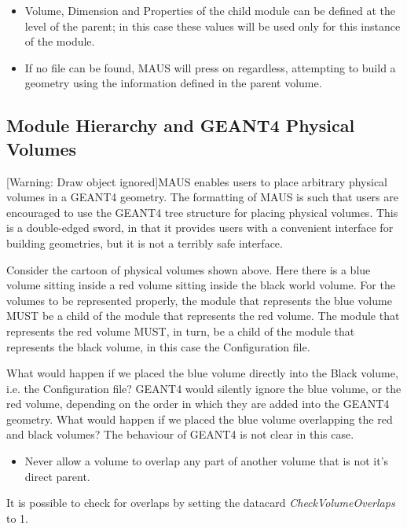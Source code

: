\liststyleLi
\begin{itemize}
\item Volume, Dimension and Properties of the child module can be defined at the level of the parent; in this case these
values will be used only for this instance of the module.
\end{itemize}
\liststyleLii
\begin{itemize}
\item If no file can be found, MAUS will press on regardless, attempting to build a geometry using the information
defined in the parent volume.
\end{itemize}
\subsection[Module Hierarchy and GEANT4 Physical Volumes]{Module Hierarchy and GEANT4 Physical Volumes}
[Warning: Draw object ignored]MAUS enables users to place arbitrary physical volumes in a GEANT4 geometry. The
formatting of MAUS is such that users are encouraged to use the GEANT4 tree structure for placing physical volumes.
This is a double-edged sword, in that it provides users with a convenient interface for building geometries, but it is
not a terribly safe interface.

Consider the cartoon of physical volumes shown above. Here there is a blue volume sitting inside a red volume sitting
inside the black world volume. For the volumes to be represented properly, the module that represents the blue volume
MUST be a child of the module that represents the red volume. The module that represents the red volume MUST, in turn,
be a child of the module that represents the black volume, in this case the Configuration file.

What would happen if we placed the blue volume directly into the Black volume, i.e. the Configuration file? GEANT4 would
silently ignore the blue volume, or the red volume, depending on the order in which they are added into the GEANT4
geometry. What would happen if we placed the blue volume overlapping the red and black volumes? The behaviour of GEANT4
is not clear in this case.

\liststyleLiii
\begin{itemize}
\item Never allow a volume to overlap any part of another volume that is not it's direct parent.
\end{itemize}
It is possible to check for overlaps by setting the datacard \textit{CheckVolumeOverlaps} to 1.

